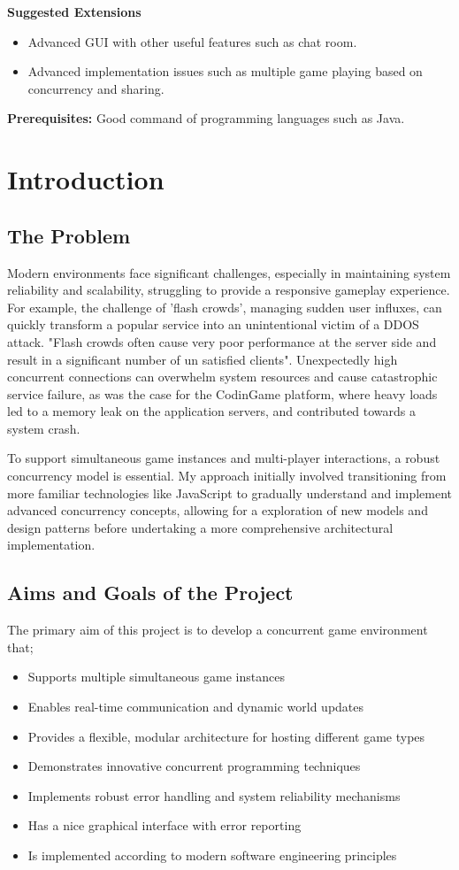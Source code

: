 \documentclass[]{project_interim}
\begin{document}
\textbf{Suggested Extensions}
\begin{itemize}
  \item Advanced GUI with other useful features such as chat room.
  \item Advanced implementation issues such as multiple game playing based on concurrency and sharing.
\end{itemize}

\textbf{Prerequisites:} Good command of programming languages such as Java.


\chapter{Introduction}
\section{The Problem}
Modern environments face significant challenges, especially in maintaining
system reliability and scalability, struggling to provide a responsive gameplay
experience. For example, the challenge of 'flash crowds', managing sudden user influxes,
can quickly transform a popular service into an unintentional victim of a
DDOS attack. "Flash crowds often cause very poor performance
at the server side and result in a significant number of un
satisfied clients"\cite{Ari_crss_nodate}. Unexpectedly high concurrent connections can overwhelm
system resources and cause catastrophic service failure, as was the case for
the CodinGame platform, where heavy loads led to a memory leak on the application
servers, and contributed towards a system crash\cite{jobert_story_2017}.

To support simultaneous game instances and multi-player interactions,
a robust concurrency model is essential. My approach initially involved
transitioning from more familiar technologies like JavaScript to
gradually understand and implement advanced concurrency concepts,
allowing for a exploration of new models and design patterns before
undertaking a more comprehensive architectural implementation.

\section{Aims and Goals of the Project}
The primary aim of this project is to develop a concurrent game environment that;
\begin{itemize}
  \item Supports multiple simultaneous game instances
  \item Enables real-time communication and dynamic world updates
  \item Provides a flexible, modular architecture for hosting different game types
  \item Demonstrates innovative concurrent programming techniques
  \item Implements robust error handling and system reliability mechanisms
  \item Has a nice graphical interface with error reporting
  \item Is implemented according to modern software engineering principles
\end{itemize}
\end{document}
